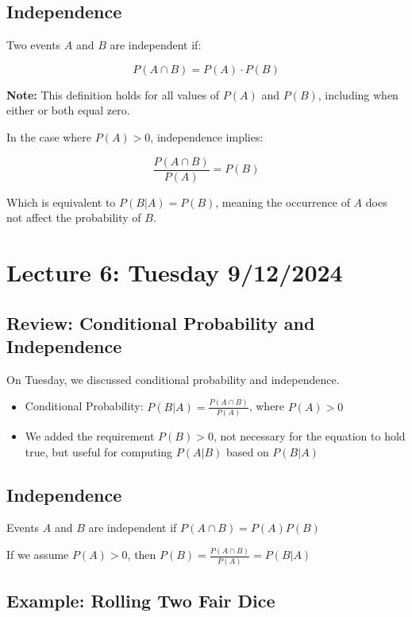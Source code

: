 \documentclass{article}
\begin{document}
    \subsection*{Independence}
    
    Two events $A$ and $B$ are independent if:
    
    \[
    P(A \cap B) = P(A) \cdot P(B)
    \]

    \textbf{Note:} This definition holds for all values of $P(A)$ and $P(B)$, including when either or both equal zero.
    
    In the case where $P(A) > 0$, independence implies:
    
    \[
    \frac{P(A \cap B)}{P(A)} = P(B)
    \]
    
    Which is equivalent to $P(B|A) = P(B)$, meaning the occurrence of $A$ does not affect the probability of $B$.
    
    
    \section*{Lecture 6: Tuesday 9/12/2024}
    
    \subsection*{Review: Conditional Probability and Independence}
    
    On Tuesday, we discussed conditional probability and independence.
    
    \begin{itemize}
        \item Conditional Probability: $P(B|A) = \frac{P(A \cap B)}{P(A)}$, where $P(A) > 0$
        \item We added the requirement $P(B) > 0$, not necessary for the equation to hold true, but useful for computing $P(A|B)$ based on $P(B|A)$
    \end{itemize}
    
    \subsection*{Independence}
    
    Events $A$ and $B$ are independent if $P(A \cap B) = P(A)P(B)$
    
    If we assume $P(A) > 0$, then $P(B) = \frac{P(A \cap B)}{P(A)} = P(B|A)$
    
    \subsection*{Example: Rolling Two Fair Dice}
    
\end{document}
